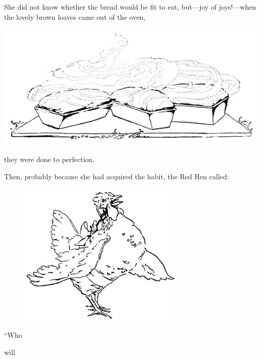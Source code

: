 \documentclass[letterpaper, 10pt, openany]{memoir}
\begin{document}
She did not know whether the bread would be fit to eat, but—joy of joys!—when the lovely brown
loaves came out of the oven,

\begin{center}
	\includegraphics[width=\textwidth]{image_029.jpg}
\end{center}

they were done to perfection.

\newpage
Then, probably because she had acquired the habit, the Red Hen called:

\vspace{\onelineskip}

\begin{figure}
	\includegraphics[width=0.7\textwidth]{image_030.jpg}
\end{figure}

``Who

\vspace{\onelineskip}

\indent\hspace{0.25cm} will

\vspace{\onelineskip}
\end{document}
